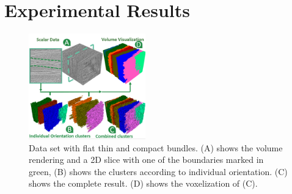 \section {Experimental Results}
\label {sec:results}
%	

\begin{figure}[t]
\centering
	\includegraphics[width=0.45\textwidth]{imagesMT2014/image8.PNG}
	\caption{Data set with flat thin and compact bundles. (A) shows the volume rendering and a 2D slice with one of the boundaries marked in green, (B) shows the clusters according to individual orientation. (C) shows the complete result. (D) shows the voxelization of (C).}
	\label{fig:prepreg}
\end{figure}



